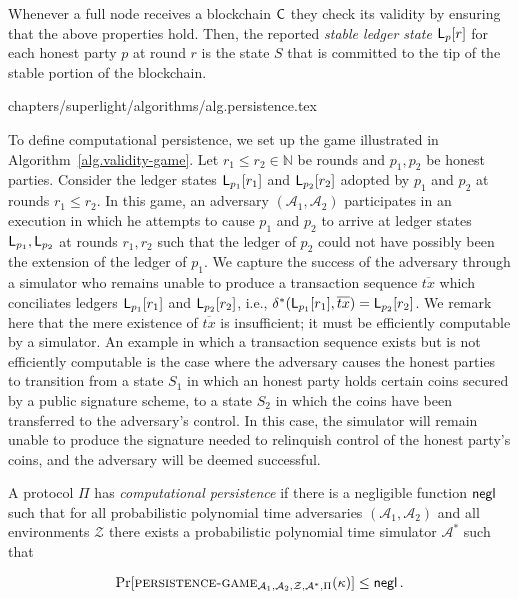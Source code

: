 Whenever a full node receives a blockchain $\mathsf{C}$ they check its validity by
ensuring that the above properties hold. Then, the reported \emph{stable ledger
state} $\mathsf{L}_{p}[r]$ for each honest party $p$ at round $r$ is the state $S$
that is committed to the tip of the stable portion of the blockchain.

{chapters/superlight/algorithms/alg.persistence.tex}

To define computational persistence, we set up the game illustrated in
Algorithm~\ref{alg.validity-game}.
Let
$r_1 \leq r_2 \in \mathbb{N}$ be rounds and $p_1, p_2$ be honest parties.
Consider the ledger states $\mathsf{L}_{p_1}[r_1]$ and $\mathsf{L}_{p_2}[r_2]$
adopted by $p_1$ and $p_2$ at rounds $r_1 \leq r_2$.
In this game, an adversary
$(\mathcal{A}_1, \mathcal{A}_2)$ participates in an execution in which he
attempts to cause $p_1$ and $p_2$ to arrive at ledger states
$\mathsf{L}_{p_1}, \mathsf{L}_{p_2}$ at rounds $r_1, r_2$ such that the ledger of
$p_2$ could not have possibly been the
extension of the ledger of $p_1$. We capture the success of the adversary
through a simulator who remains unable to produce a transaction sequence
$\overline{tx}$ which conciliates ledgers $\mathsf{L}_{p_1}[r_1]$ and
$\mathsf{L}_{p_2}[r_2]$, i.e.,
$\delta^*(\mathsf{L}_{p_1}[r_1], \overline{tx}) = \mathsf{L}_{p_2}[r_2]$. We remark
here that the mere existence of $\overline{tx}$ is insufficient; it must be
efficiently computable by a simulator. An example in which a transaction
sequence exists but is not efficiently computable is the case where the
adversary causes the honest parties to transition from a state $S_1$ in which
an honest party holds certain coins secured by a public signature scheme, to
a state $S_2$ in which the coins have been transferred to the adversary's
control. In this case, the simulator will remain unable to produce the signature
needed to relinquish control of the honest party's coins, and the adversary will
be deemed successful.

\begin{definition}
  A protocol $\Pi$ has \emph{computational persistence} if there is a negligible
  function $\mathsf{negl}$ such that for all probabilistic
  polynomial time adversaries $(\mathcal{A}_1, \mathcal{A}_2)$ and all environments $\mathcal{Z}$
  there exists a probabilistic
  polynomial time simulator $\mathcal{A}^*$ such that

  \[
  \Pr[\textsc{persistence}\textsc{-}\textsc{game}_{\mathcal{A}_1,\mathcal{A}_2,\mathcal{Z},\mathcal{A}^*,\Pi}(\kappa)]
  \leq \mathsf{negl}
  \,.
  \]
\end{definition}

